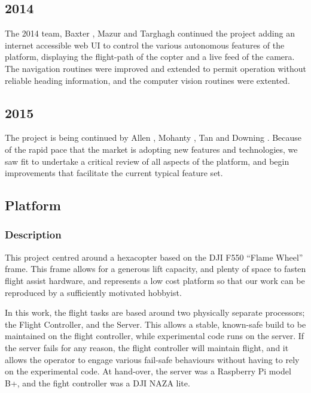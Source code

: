 \documentclass[a4paper, 11pt, titlepage]{article}
\begin{document}
    \subsection{2014}

      The 2014 team, Baxter \cite{Baxter}, Mazur \cite{Mazur} and Targhagh \cite{Targhagh} continued the project adding an internet accessible web UI to control the various autonomous features of the platform, displaying the flight-path of the copter and a live feed of the camera.
      The navigation routines were improved and extended to permit operation without reliable heading information, and the computer vision routines were extented.

    \subsection{2015}
      The project is being continued by Allen \cite{Allen}, Mohanty \cite{Mohanty}, Tan \cite{Tan} and Downing \cite{Downing}.
      Because of the rapid pace that the market is adopting new features and technologies, we saw fit to undertake a critical review of all aspects of the platform, and begin improvements that facilitate the current typical feature set.

  \subsection{Platform}
    \subsubsection{Description}
      This project centred around a hexacopter based on the DJI F550 ``Flame Wheel'' frame. This frame allows for a generous lift capacity, and plenty of space to fasten flight assist hardware, and represents a low cost platform so that our work can be reproduced by a sufficiently motivated hobbyist.
      
      In this work, the flight tasks are based around two physically separate processors; the Flight Controller, and the Server. This allows a stable, known-safe build to be maintained on the flight controller, while experimental code runs on the server. If the server fails for any reason, the flight controller will maintain flight, and it allows the operator to engage various fail-safe behaviours without having to rely on the experimental code.
      At hand-over, the server was a Raspberry Pi model B+, and the fight controller was a DJI NAZA lite.
      
\end{document}
